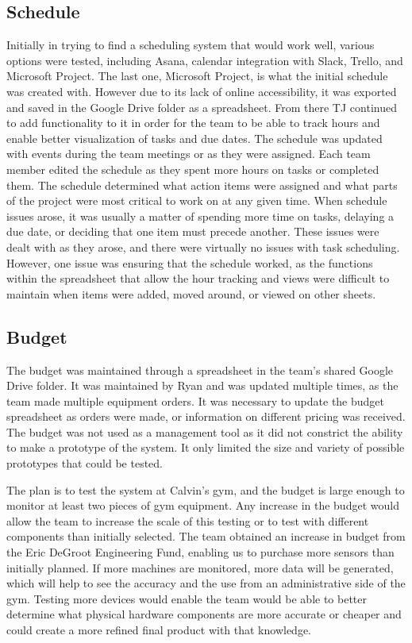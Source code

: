 \documentclass[PPFS.tex]{template/subfiles}
\begin{document}
    \subsection{Schedule}
	Initially in trying to find a scheduling system that would work well, various options were tested, including Asana, calendar integration with Slack, Trello, and Microsoft Project. The last one, Microsoft Project, is what the initial schedule was created with. However due to its lack of online accessibility, it was exported and saved in the Google Drive folder as a spreadsheet. From there TJ continued to add functionality to it in order for the team to be able to track hours and enable better visualization of tasks and due dates. The schedule was updated with events during the team meetings or as they were assigned. Each team member edited the schedule as they spent more hours on tasks or completed them. The schedule determined what action items were assigned and what parts of the project were most critical to work on at any given time. When schedule issues arose, it was usually a matter of spending more time on tasks, delaying a due date, or deciding that one item must precede another. These issues were dealt with as they arose, and there were virtually no issues with task scheduling. However, one issue was ensuring that the schedule worked, as the functions within the spreadsheet that allow the hour tracking and views were difficult to maintain when items were added, moved around, or viewed on other sheets.
	
    \subsection{Budget}
    The budget was maintained through a spreadsheet in the team's shared Google Drive folder. It was maintained by Ryan and was updated multiple times, as the team made multiple equipment orders. It was necessary to update the budget spreadsheet as orders were made, or information on different pricing was received. The budget was not used as a management tool as it did not constrict the ability to make a prototype of the system. It only limited the size and variety of possible prototypes that could be tested.
    
    The plan is to test the system at Calvin's gym, and the budget is large enough to monitor at least two pieces of gym equipment. Any increase in the budget would allow the team to increase the scale of this testing or to test with different components than initially selected. The team obtained an increase in budget from the Eric DeGroot Engineering Fund, enabling us to purchase more sensors than initially planned. If more machines are monitored, more data will be generated, which will help to see the accuracy and the use from an administrative side of the gym. Testing more devices would enable the team would be able to better determine what physical hardware components are more accurate or cheaper and could create a more refined final product with that knowledge. 
    
\end{document}
